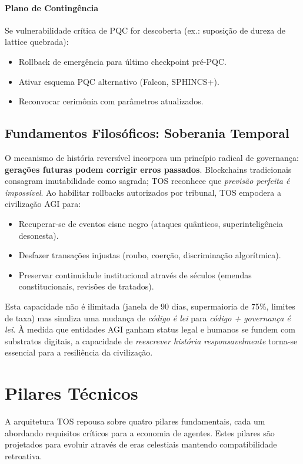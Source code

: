 \documentclass[11pt]{article}
\begin{document}
\paragraph{Plano de Contingência}
Se vulnerabilidade crítica de PQC for descoberta (ex.: suposição de dureza de lattice quebrada):
\begin{itemize}[noitemsep]
  \item Rollback de emergência para último checkpoint pré-PQC.
  \item Ativar esquema PQC alternativo (Falcon, SPHINCS+).
  \item Reconvocar cerimônia com parâmetros atualizados.
\end{itemize}

\subsection{Fundamentos Filosóficos: Soberania Temporal}

O mecanismo de história reversível incorpora um princípio radical de governança: \textbf{gerações futuras podem corrigir erros passados}. Blockchains tradicionais consagram imutabilidade como sagrada; TOS reconhece que \emph{previsão perfeita é impossível}. Ao habilitar rollbacks autorizados por tribunal, TOS empodera a civilização AGI para:
\begin{itemize}[noitemsep]
  \item Recuperar-se de eventos cisne negro (ataques quânticos, superinteligência desonesta).
  \item Desfazer transações injustas (roubo, coerção, discriminação algorítmica).
  \item Preservar continuidade institucional através de séculos (emendas constitucionais, revisões de tratados).
\end{itemize}

Esta capacidade não é ilimitada (janela de 90 dias, supermaioria de 75\%, limites de taxa) mas sinaliza uma mudança de \emph{código é lei} para \emph{código + governança é lei}. À medida que entidades AGI ganham status legal e humanos se fundem com substratos digitais, a capacidade de \emph{reescrever história responsavelmente} torna-se essencial para a resiliência da civilização.

\section{Pilares Técnicos}

A arquitetura TOS repousa sobre quatro pilares fundamentais, cada um abordando requisitos críticos para a economia de agentes. Estes pilares são projetados para evoluir através de eras celestiais mantendo compatibilidade retroativa.
\end{document}
